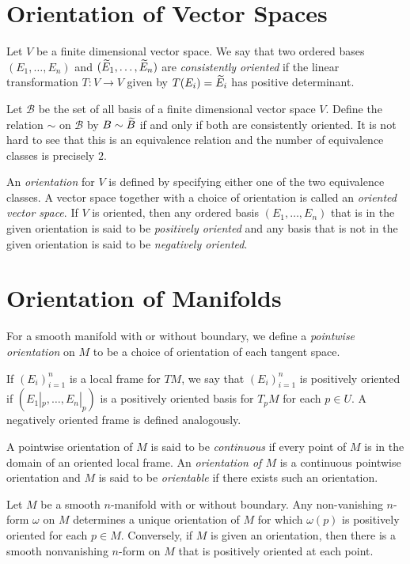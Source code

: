\section{Orientation of Vector Spaces}

\begin{definition}
    Let $V$ be a finite dimensional vector space. We say that two ordered bases $(E_1,\dots, E_n)$ and $(\widetilde{E}_1,\dots,\widetilde{E}_n)$ are \emph{consistently oriented} if the linear transformation $T: V\to V$ given by $T(E_i) = \widetilde{E}_i$ has positive determinant.
\end{definition}

Let $\mathscr B$ be the set of all basis of a finite dimensional vector space $V$. Define the relation $\sim$ on $\mathscr B$ by $B\sim\widetilde{B}$ if and only if both are consistently oriented. It is not hard to see that this is an equivalence relation and the number of equivalence classes is precisely $2$.

\begin{definition}
    An \emph{orientation} for $V$ is defined by specifying either one of the two equivalence classes. A vector space together with a choice of orientation is called an \emph{oriented vector space}. If $V$ is oriented, then any ordered basis $(E_1,\dots, E_n)$ that is in the given orientation is said to be \emph{positively oriented} and any basis that is not in the given orientation is said to be \emph{negatively oriented}.
\end{definition}

\section{Orientation of Manifolds}

\begin{definition}
    For a smooth manifold with or without boundary, we define a \emph{pointwise orientation} on $M$ to be a choice of orientation of each tangent space.

    If $(E_i)_{i = 1}^n$ is a local frame for $TM$, we say that $(E_i)_{i = 1}^n$ is positively oriented if $(E_1|_p,\dots,E_n|_p)$ is a positively oriented basis for $T_pM$ for each $p\in U$. A negatively oriented frame is defined analogously.

    A pointwise orientation of $M$ is said to be \emph{continuous} if every point of $M$ is in the domain of an oriented local frame. An \emph{orientation of $M$} is a continuous pointwise orientation and $M$ is said to be \emph{orientable} if there exists such an orientation.
\end{definition}


\begin{theorem}
    Let $M$ be a smooth $n$-manifold with or without boundary. Any non-vanishing $n$-form $\omega$ on $M$ determines a unique orientation of $M$ for which $\omega(p)$ is positively oriented for each $p\in M$. Conversely, if $M$ is given an orientation, then there is a smooth nonvanishing $n$-form on $M$ that is positively oriented at each point.
\end{theorem}